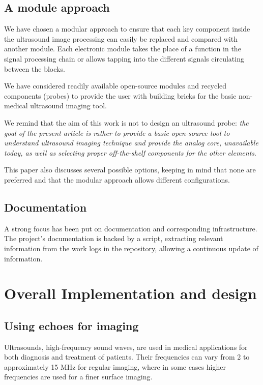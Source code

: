 \documentclass[letterpaper, 10 pt, conference]{ieeeconf} %
\begin{document}
\subsection{A module approach}

We have chosen a modular approach to ensure that each key component inside the ultrasound image processing can easily be replaced and compared with another module. Each electronic module takes the place of a function in the signal processing chain or allows tapping into the different signals circulating between the blocks.

We have considered readily available open-source modules and recycled components (probes) to provide the user with building bricks for the basic non-medical ultrasound imaging tool. 

We remind that the aim of this work is not to design an ultrasound probe: \textit{the goal of the present article is rather to provide a basic open-source tool to understand ultrasound imaging technique and provide the analog core, unavailable today, as well as selecting proper off-the-shelf components for the other elements}.

This paper also discusses several possible options, keeping in mind that none are preferred and that the modular approach allows  different configurations. 

\subsection{Documentation}

A strong focus has been put on documentation and corresponding infrastructure. The project's documentation is backed by a script, extracting relevant information from the work logs in the repository, allowing a continuous update of information.

\section{Overall Implementation and design}

\subsection{Using echoes for imaging}

Ultrasounds, high-frequency sound waves, are used in medical applications for both diagnosis and treatment of patients. Their frequencies can vary from 2 to approximately 15 MHz for regular imaging, where in some cases higher frequencies are used for a finer surface imaging.
\end{document}
